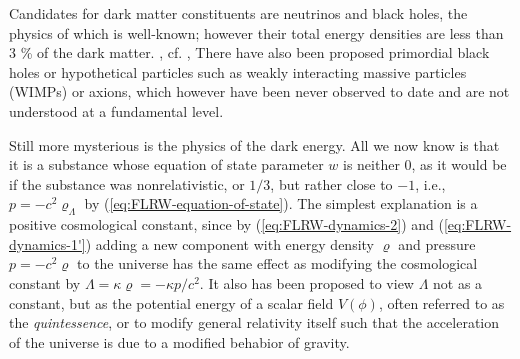 Candidates for dark matter constituents are neutrinos and black holes, the physics of which is well-known; however their total energy densities are less than 3 \% of the dark matter. \cite[140]{Ryden-2017}, cf. \cites{Ahlen-et-al-2025}, \cite[46]{Dodelson-Schmidt-2025}
There have also been proposed primordial black holes or hypothetical particles such as weakly interacting massive particles (WIMPs) or axions, which however have been never observed to date and are not understood at a fundamental level. \cite{Planck-Collaboration-2020}

Still more mysterious is the physics of the dark energy. All we now know is that it is a substance whose equation of state parameter $w$ is neither 0, as it would be if the substance was nonrelativistic, or $1/3$, but rather close to $-1$, i.e., $p = -c^2 \varrho_\Lambda$ by (\ref{eq:FLRW-equation-of-state}).
The simplest explanation is a positive cosmological constant, since by (\ref{eq:FLRW-dynamics-2}) and (\ref{eq:FLRW-dynamics-1'}) adding a new component with energy density $\varrho$ and pressure $p = -c^2 \varrho$ to the universe has the same effect as modifying the cosmological constant by $\Lambda = \kappa \varrho = - \kappa p / c^2$. \cite[64]{Ryden-2017}
It also has been proposed to view $\Lambda$ not as a constant, but as the potential energy of a scalar field $V(\phi)$, often referred to as the \emph{quintessence}, or to modify general relativity itself such that the acceleration of the universe is due to a modified behabior of gravity. \cite[50]{Dodelson-Schmidt-2025}


